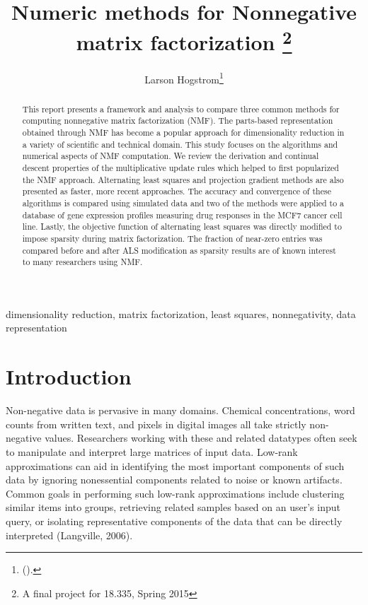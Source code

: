 \documentclass[final,leqno,onefignum,onetabnum]{siamltex1213}
\title{Numeric methods for Nonnegative matrix factorization \thanks{A final project for 18.335, Spring 2015}}
\author{Larson Hogstrom\thanks{
(\email{hogstrom@mit.edu}). }}
\begin{document}
\maketitle
{}%

\begin{abstract}
This report presents a framework and analysis to compare three common methods for computing nonnegative matrix factorization (NMF). The parts-based representation obtained through NMF has become a popular approach for dimensionality reduction in a variety of scientific and technical domain. This study focuses on the algorithms and numerical aspects of NMF computation. We review the derivation and continual descent properties of the multiplicative update rules which helped to first popularized the NMF approach. Alternating least squares and projection gradient methods are also presented as faster, more recent approaches. The accuracy and convergence of these algorithms is compared using simulated data and two of the methods were applied to a database of gene expression profiles measuring drug responses in the MCF7 cancer cell line. Lastly, the objective function of alternating least squares was directly modified to impose sparsity during matrix factorization. The fraction of near-zero entries was compared before and after ALS modification as sparsity results are of known interest to many researchers using NMF. 
\end{abstract}

\begin{keywords} dimensionality reduction, matrix factorization, least squares, nonnegativity, data representation \end{keywords}



\pagestyle{myheadings}
\thispagestyle{plain}

\section{Introduction}

Non-negative data is pervasive in many domains. Chemical concentrations, word counts from written text, and pixels in digital images all take strictly non-negative values. Researchers working with these and related datatypes often seek to manipulate and interpret large matrices of input data. Low-rank approximations can aid in identifying the most important components of such data by ignoring nonessential components related to noise or known artifacts. Common goals in performing such low-rank approximations include clustering similar items into groups, retrieving related samples based on an user's input query, or isolating representative components of the data that can be directly interpreted (Langville, 2006).  
\end{document}
